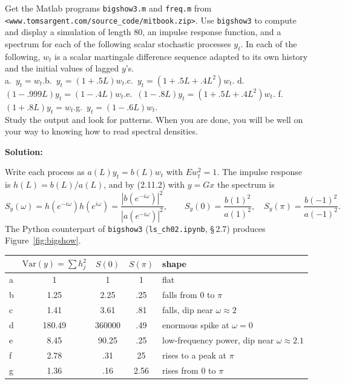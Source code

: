 \documentclass[12pt, letterpaper]{article}
\newcommand{\Var}{\mathrm{Var}}
\newcommand{\nb}[1]{\texttt{ls\_ch02.ipynb}, \S\,#1}
\begin{document}
\begin{tcolorbox}[oddbox,title={Exercise 2.7 \quad Simulations, Impulse Responses and Spectra}]
\begin{tcolorbox}[questionbox]
Get the Matlab programs \texttt{bigshow3.m} and \texttt{freq.m} from
\texttt{<www.tomsargent.com/source\_code/mitbook.zip>}. Use \texttt{bigshow3} to compute and display
a simulation of length 80, an impulse response function, and a spectrum for each of the following
scalar stochastic processes $y_t$. In each of the following, $w_t$ is a scalar martingale difference
sequence adapted to its own history and the initial values of lagged $y$'s.\\[3pt]
a.\ $y_t=w_t$.\quad b.\ $y_t=(1+.5L)w_t$.\quad c.\ $y_t=(1+.5L+.4L^2)w_t$.\quad
d.\ $(1-.999L)y_t=(1-.4L)w_t$.\quad e.\ $(1-.8L)y_t=(1+.5L+.4L^2)w_t$.\quad
f.\ $(1+.8L)y_t=w_t$.\quad g.\ $y_t=(1-.6L)w_t$.\\
Study the output and look for patterns. When you are done, you will be well on your way to knowing
how to read spectral densities.
\end{tcolorbox}

\textbf{Solution:}

Write each process as $a(L)y_t=b(L)w_t$ with $Ew_t^2=1$. The impulse response is
$h(L)=b(L)/a(L)$, and by (2.11.2) with $y=Gx$ the spectrum is
\[
S_y(\omega)=h(e^{-i\omega})h(e^{i\omega})=\frac{|b(e^{-i\omega})|^2}{|a(e^{-i\omega})|^2},
\qquad S_y(0)=\frac{b(1)^2}{a(1)^2},\quad S_y(\pi)=\frac{b(-1)^2}{a(-1)^2}.
\]
The Python counterpart of \texttt{bigshow3} (\nb{2.7}) produces Figure~\ref{fig:bigshow}.

\begin{center}\small
\begin{tabular}{@{}lcccl@{}}
\toprule
 & $\Var(y)=\sum h_j^2$ & $S(0)$ & $S(\pi)$ & shape\\
\midrule
a & 1 & 1 & 1 & flat\\
b & 1.25 & 2.25 & .25 & falls from $0$ to $\pi$\\
c & 1.41 & 3.61 & .81 & falls, dip near $\omega\approx2$\\
d & 180.49 & 360000 & .49 & enormous spike at $\omega=0$\\
e & 8.45 & 90.25 & .25 & low-frequency power, dip near $\omega\approx2.1$\\
f & 2.78 & .31 & 25 & rises to a peak at $\pi$\\
g & 1.36 & .16 & 2.56 & rises from $0$ to $\pi$\\
\bottomrule
\end{tabular}
\end{center}


\end{tcolorbox}
\end{document}

